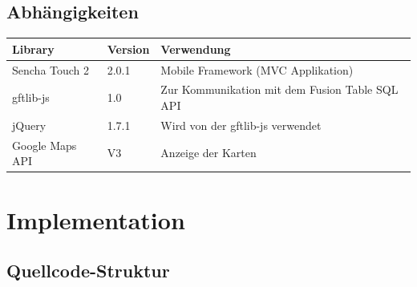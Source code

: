 \subsection{Abhängigkeiten}
\begin{longtable}{|l|l|p{10cm}|}
\hline 
\textbf{Library} & \textbf{Version} & \textbf{Verwendung} \\ 
\hline 
Sencha Touch 2 & 2.0.1 & Mobile Framework (MVC Applikation) \\ 
\hline 
gftlib-js & 1.0 & Zur Kommunikation mit dem Fusion Table SQL API \\ 
\hline 
jQuery & 1.7.1 & Wird von der gftlib-js verwendet \\ 
\hline 
Google Maps API & V3 & Anzeige der Karten \\ 
\hline 
\end{longtable} 

\section{Implementation}
\subsection{Quellcode-Struktur}


